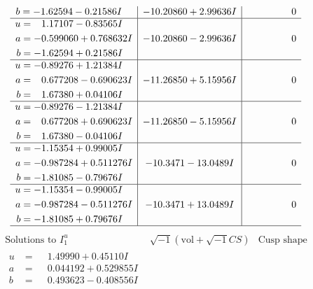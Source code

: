 \documentclass[1p]{elsarticle_modified}
\theoremstyle{definition}
\newcommand{\I}{\sqrt{-1}}
\begin{document}
$$\begin{array}{c|c|c}
\begin{aligned}
b &= -1.62594 - 0.21586 I\end{aligned}
 & -10.20860 + 2.99636 I & \phantom{-0.000000 } 0 \\ \hline\begin{aligned}
u &= \phantom{-}1.17107 - 0.83565 I \\
a &= -0.599060 + 0.768632 I \\
b &= -1.62594 + 0.21586 I\end{aligned}
 & -10.20860 - 2.99636 I & \phantom{-0.000000 } 0 \\ \hline\begin{aligned}
u &= -0.89276 + 1.21384 I \\
a &= \phantom{-}0.677208 - 0.690623 I \\
b &= \phantom{-}1.67380 + 0.04106 I\end{aligned}
 & -11.26850 + 5.15956 I & \phantom{-0.000000 } 0 \\ \hline\begin{aligned}
u &= -0.89276 - 1.21384 I \\
a &= \phantom{-}0.677208 + 0.690623 I \\
b &= \phantom{-}1.67380 - 0.04106 I\end{aligned}
 & -11.26850 - 5.15956 I & \phantom{-0.000000 } 0 \\ \hline\begin{aligned}
u &= -1.15354 + 0.99005 I \\
a &= -0.987284 + 0.511276 I \\
b &= -1.81085 - 0.79676 I\end{aligned}
 & -10.3471 - 13.0489 I & \phantom{-0.000000 } 0 \\ \hline\begin{aligned}
u &= -1.15354 - 0.99005 I \\
a &= -0.987284 - 0.511276 I \\
b &= -1.81085 + 0.79676 I\end{aligned}
 & -10.3471 + 13.0489 I & \phantom{-0.000000 } 0\\
 \hline 
 \end{array}$$\newpage$$\begin{array}{c|c|c}  
\text{Solutions to }I^u_{1}& \I (\text{vol} + \sqrt{-1}CS) & \text{Cusp shape}\\
 \hline 
\begin{aligned}
u &= \phantom{-}1.49990 + 0.45110 I \\
a &= \phantom{-}0.044192 + 0.529855 I \\
b &= \phantom{-}0.493623 - 0.408556 I\end{aligned}

\end{array}$$
\end{document}
